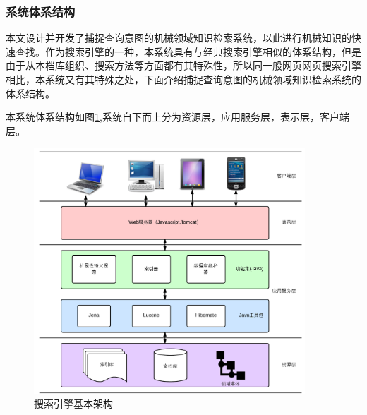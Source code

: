 \documentclass[12pt,a4paper]{article}
\begin{document}
		\subsubsection{系统体系结构}
	本文设计并开发了捕捉查询意图的机械领域知识检索系统，以此进行机械知识的快速查找。作为搜索引擎的一种，本系统具有与经典搜索引擎相似的体系结构，但是由于从本档库组织、搜索方法等方面都有其特殊性，所以同一般网页网页搜索引擎相比，本系统又有其特殊之处，下面介绍捕捉查询意图的机械领域知识检索系统的体系结构。
	
	本系统体系结构如图\ref{fig:体系结构},系统自下而上分为资源层，应用服务层，表示层，客户端层。
	
	\begin{figure}[htbp] 
	\centering\includegraphics[width=4in]{fig/SystemStructure.png} 
	\caption{搜索引擎基本架构}\label{fig:体系结构} 
	\end{figure} 
	
\end{document}
